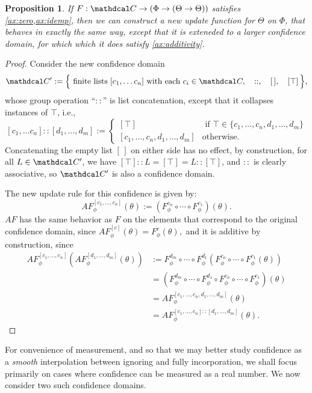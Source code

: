 \documentclass{uai2023}
\theoremstyle{plain}
\newtheorem{prop}[theorem]{Proposition}
\theoremstyle{definition}
\newcounter{proofcntr}
\newenvironment{lproof}{\begin{proof}\refstepcounter{proofcntr}}{\end{proof}}
\newcommand\confdom{\mathdcal C}
\begin{document}
\begin{prop} \label{prop:free-additivity}
	If $F: \confdom \to (\Phi \to (\Theta \to \Theta))$ satisfies \cref{ax:zero,ax:idemp}, then we can construct a new update
function for $\Theta$ on $\Phi$, that behaves in exactly the same way, except that it is exteneded to a larger confidence domain, for which which it does satisfy \cref{ax:additivity}.
\end{prop}
\begin{lproof}
Consider the new confidence domain
$$
	\confdom' := \Big\{ \text{ finite lists } [c_1, \ldots c_n]
		\text{ with each } c_i \in \confdom,
\quad
::,
		\quad
		[\,],
		\quad
		[\top]
		\,
	\Big\},
$$
whose group operation ``$::$'' is list concatenation, except that it collapses instances of $\top$, i.e.,
\[
	[c_1, \ldots c_n] :: [d_1, \ldots, d_m]
	 := \begin{cases}
[\top] & \text{ if } \top \in \{c_1, \ldots, c_n,d_1, \ldots,d_m \} \\
		 [c_1, \ldots, c_{n}, d_1, \ldots, d_m] & \text{otherwise.}
 \end{cases}
\]
Concatenating the empty list $[\,]$ on either side has no effect,
by construction, for all $L \in \confdom'$, we have $[\top] :: L = [\top] = L :: [\top]$,
and $::$ is clearly associative, so $\confdom'$ is also a confidence domain.

The new update rule for this confidence is given by:
	\[
		AF^{[c_1, \ldots, c_n]}_\phi (\theta)  :=
				(F^{c_n}_\phi \circ \cdots \circ F^{c_1}_\phi) (\theta).
	\]
$AF$ has the same behavior as $F$ on the elements that correspond to the original confidence domain, since
$
	AF^{[c]}_\phi(\theta) = F^c_\phi(\theta),
$
and it is additive by construction, since
\begin{align*}
AF^{[c_1, \ldots, c_n]}_\phi ( AF^{[d_1, \ldots, d_m]}_\phi (\theta) )
		&:=
			F^{d_m}_\phi \circ \cdots \circ F^{d_1}_\phi (
			F^{c_n}_\phi \circ \cdots \circ F^{c_1}_\phi (\theta))\\
		&= (F^{d_m}_\phi \circ \cdots \circ F^{d_1}_\phi \circ
		F^{c_n}_\phi \circ \cdots \circ F^{c_1}_\phi) (\theta) \\
		&= AF^{[c_1, \ldots, c_n, d_1, \ldots, d_m]}_\phi (\theta) \\
		&= AF^{[c_1, \ldots, c_n] :: [d_1, \ldots, d_m]}_\phi (\theta).
\end{align*}
\end{lproof}For convenience of measurement, and so that we may better study confidence as a \emph{smooth} interpolation between ignoring and fully incorporation, we shall focus primarily on cases where confidence can be measured as a real number.
We now consider two such confidence domains.
\end{document}
